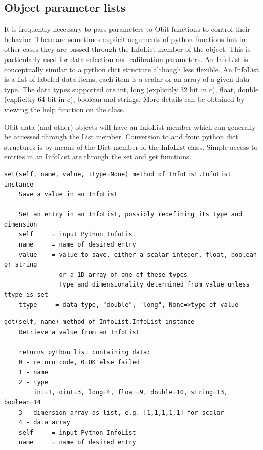 \documentclass[11pt]{report}
\begin{document}
\subsection{Object parameter lists\label{ParmList}}
It is frequently necessary to pass parameters to Obit functions to
control their behavior.
These are sometimes explicit arguments of python functions but in
other cases they are passed through the InfoList member of the object.
This is particularly used for data selection and calibration
parameters.
An InfoList is conceptually similar to a python dict structure
although less flexible.
An InfoList is a list of labeled data items, each item is a scalar or
an array of a given data type.
The data types supported are int, long (explicitly 32 bit in c),
float, double (explicitly 64 bit in c), boolean and strings.
More details can be obtained by viewing the help function on the
class.

Obit data (and other) objects will have an InfoList member which can
generally be accessed through the List member.
Conversion to and from python dict structures is by means of the Dict
member of the InfoList class.
Simple access to entries in an InfoList are through the set and get
functions.
\begin{verbatim}
set(self, name, value, ttype=None) method of InfoList.InfoList instance
    Save a value in an InfoList
    
    Set an entry in an InfoList, possibly redefining its type and dimension
    self     = input Python InfoList
    name     = name of desired entry
    value    = value to save, either a scalar integer, float, boolean or string
               or a 1D array of one of these types
               Type and dimensionality determined from value unless ttype is set
    ttype     = data type, "double", "long", None=>type of value
\end{verbatim}

\begin{verbatim}
get(self, name) method of InfoList.InfoList instance
    Retrieve a value from an InfoList
    
    returns python list containing data:
    0 - return code, 0=OK else failed
    1 - name
    2 - type
        int=1, oint=3, long=4, float=9, double=10, string=13, boolean=14
    3 - dimension array as list, e.g. [1,1,1,1,1] for scalar
    4 - data array
    self     = input Python InfoList
    name     = name of desired entry
\end{verbatim}
\end{document}

